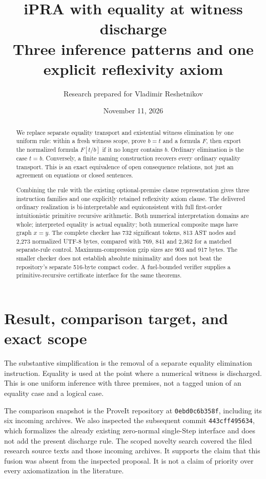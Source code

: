 \documentclass[11pt,letterpaper]{article}
\title{\color{ink}iPRA with equality at witness discharge\\[5pt]
\large Three inference patterns and one explicit reflexivity axiom}
\author{Research prepared for Vladimir Reshetnikov}
\date{November 11, 2026}
\theoremstyle{definition}\newtheorem{definition}[theorem]{Definition}
\theoremstyle{remark}\newtheorem{remark}[theorem]{Remark}
\begin{document}
\maketitle
\begin{abstract}
We replace separate equality transport and existential witness elimination
by one uniform rule: within a fresh witness scope, prove $b=t$ and a formula
$F$, then export the normalized formula $F[t/b]$ if it no longer contains
$b$. Ordinary elimination is the case $t=b$. Conversely, a finite naming
construction recovers every ordinary equality transport. This is an exact
equivalence of open consequence relations, not just an agreement on equations
or closed sentences.

Combining the rule with the existing optional-premise clause representation
gives three instruction families and one explicitly retained reflexivity
axiom clause. The delivered ordinary realization is bi-interpretable and
equiconsistent with full first-order intuitionistic primitive recursive
arithmetic. Both numerical interpretation domains are whole; interpreted
equality is actual equality; both numerical composite maps have graph $x=y$.
The complete checker has 732 significant tokens, 813 AST nodes and 2,273
normalized UTF-8 bytes, compared with 769, 841 and 2,362 for a matched
separate-rule control. Maximum-compression gzip sizes are 903 and 917 bytes.
The smaller checker does not establish absolute minimality and does not beat
the repository's separate 516-byte compact codec. A fuel-bounded verifier
supplies a primitive-recursive certificate interface for the same theorems.
\end{abstract}
\clearpage
\begingroup
\fontsize{9}{10}\selectfont
\setlength{\parskip}{0pt}
\tableofcontents
\endgroup
\clearpage

\section{Result, comparison target, and exact scope}

The substantive simplification is the removal of a separate equality
elimination instruction. Equality is used at the point where a numerical
witness is discharged. This is one uniform inference with three premises,
not a tagged union of an equality case and a logical case.

The comparison snapshot is the ProveIt repository at
\texttt{0ebd0c6b358f}, including its six incoming
archives. We also inspected the subsequent commit
\texttt{443cff495634}, which formalizes the
already existing zero-normal single-Step interface and does not add the
present discharge rule. The scoped novelty search covered the filed
research source texts and those incoming archives. It supports the claim
that this fusion was absent from the inspected proposal. It is not a
claim of priority over every axiomatization in the literature.
\end{document}
